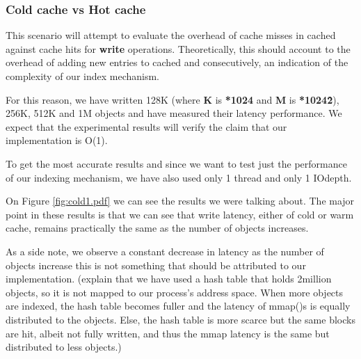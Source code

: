 \subsubsection{Cold cache vs Hot cache}

This scenario will attempt to evaluate the overhead of cache misses in cached
against cache hits for \textbf{write} operations. Theoretically, this should 
account to the overhead of adding new entries to cached and consecutively, an 
indication of the complexity of our index mechanism.

For this reason, we have written 128K (where \textbf{K} is \textbf{*1024} and 
\textbf{M} is \textbf{*1024\^2}), 256K, 512K and 1M objects and have measured 
their latency performance. We expect that the experimental results will verify 
the claim that our implementation is O(1).

To get the most accurate results and since we want to test just the performance 
of our indexing mechanism, we have also used only 1 thread and only 1 IOdepth. 

On Figure \ref{fig:cold1.pdf} we can see the results we were talking about. The 
major point in these results is that we can see that write latency, either of 
cold or warm cache, remains practically the same as the number of objects 
increases.


As a side note, we observe a constant decrease in latency as the number of 
objects increase this is not something that should be attributed to our 
implementation. (explain that we have used a hash table that holds 2million 
objects, so it is not mapped to our process's address space. When more objects 
are indexed, the hash table becomes fuller and the latency of mmap()s is 
equally distributed to the objects. Else, the hash table is more scarce but the 
same blocks are hit, albeit not fully written, and thus the mmap latency is the 
same but distributed to less objects.)
